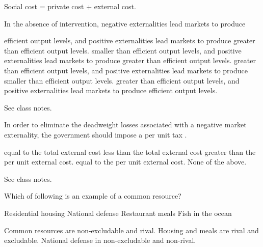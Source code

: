 \documentclass[addpoints,11pt]{exam}
\theoremstyle{definition}
\newcommand{\blank}[0]{\underline{\hspace{3cm}}}
\begin{document}
\begin{questions}
	\begin{solution} 
		Social cost = private cost + external cost.
	\end{solution}


\question In the absence of intervention, negative externalities lead markets to produce

\begin{choices}
	\choice efficient output levels, and positive externalities lead markets to produce greater than efficient output levels.
	\choice smaller than efficient output levels, and positive externalities lead markets to produce greater than efficient output levels.
	\CorrectChoice greater than efficient output levels, and positive externalities lead markets to produce smaller than efficient output levels.
	\choice greater than efficient output levels, and positive externalities lead markets to produce efficient output levels.
\end{choices}

\begin{solution}
See class notes.
\end{solution}

\newpage

\question In order to eliminate the deadweight losses associated with a negative market externality, the government should impose a per unit tax \blank.
\begin{choices}
	\choice equal to the total external cost
	\choice less than the total external cost
	\choice greater than the per unit external cost.
	\CorrectChoice equal to the per unit external cost.
	\choice None of the above.
\end{choices}

\begin{solution}
	See class notes.
\end{solution}
	
	\question Which of following is an example of a common resource?
	
	\begin{choices}
		\choice Residential housing
		\choice National defense 
		\choice Restaurant meals
		\CorrectChoice Fish in the ocean
	\end{choices}
	
	\begin{solution}
		Common resources are non-excludable and rival. Housing and meals are rival and excludable. National defense in non-excludable and non-rival.
	\end{solution}


\end{questions}
\end{document}
